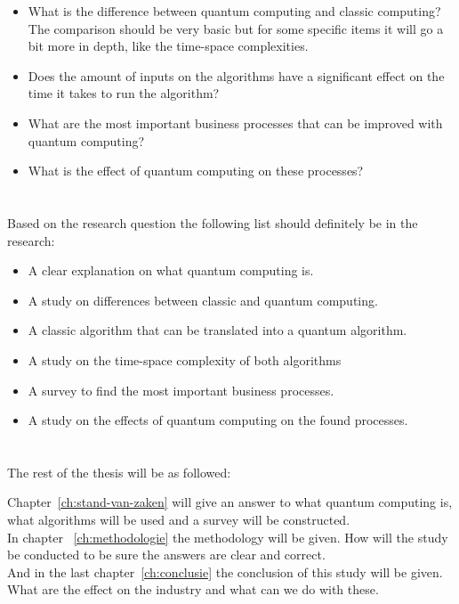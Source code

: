 \begin{itemize}
  \item What is the difference between quantum computing and classic computing? The comparison should be very basic but for some specific items it will go a bit more in depth, like the time-space complexities.
  \item Does the amount of inputs on the algorithms have a significant effect on the time it takes to run the algorithm?
  \item What are the most important business processes that can be improved with quantum computing?
  \item What is the effect of quantum computing on these processes?
\end{itemize}

\section{}
\label{sec:onderzoeksdoelstelling}

Based on the research question the following list should definitely be in the research:

\begin{itemize}
  \item A clear explanation on what quantum computing is.
  \item A study on differences between classic and quantum computing.
  \item A classic algorithm that can be translated into a quantum algorithm.
  \item A study on the time-space complexity of both algorithms
  \item A survey to find the most important business processes.
  \item A study on the effects of quantum computing on the found processes.
\end{itemize}

\section{}
\label{sec:opzet-bachelorproef}

The rest of the thesis will be as followed:

Chapter~\ref{ch:stand-van-zaken} will give an answer to what quantum computing is, what algorithms will be used and a survey will be constructed. \\
In chapter ~\ref{ch:methodologie} the methodology will be given. How will the study be conducted to be sure the answers are clear and correct. \\
And in the last chapter~\ref{ch:conclusie} the conclusion of this study will be given. What are the effect on the industry and what can we do with these.
